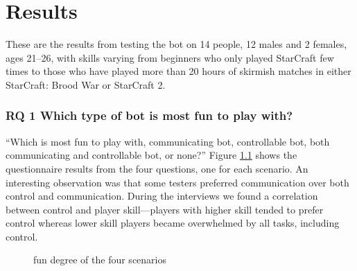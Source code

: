 \chapter{Results}
These are the results from testing the bot on 14 people, 12 males and 2 females, ages 21–26, with
skills varying from beginners who only played StarCraft few times to those who have played more
than 20 hours of skirmish matches in either StarCraft: Brood War or StarCraft 2.

\subsection{RQ 1 Which type of bot is most fun to play with?}
``Which is most fun to play with, communicating bot, controllable bot, both communicating and
controllable bot, or none?'' Figure \ref{fig:results_fun} shows the questionnaire results from the
four questions, one for each scenario. An interesting observation was that some testers preferred
communication over both control and communication. During the interviews we found a correlation
between control and player skill—players with higher skill tended to prefer control whereas lower
skill players became overwhelmed by all tasks, including control.

\begin{figure}[htb]
\caption{fun degree of the four scenarios}
\label{fig:results_fun}
\end{figure}

